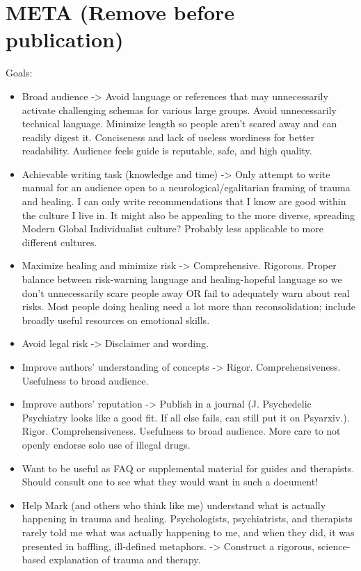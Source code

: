 \documentclass[12pt,letterpaper]{book}
\begin{document}
\section*{META (Remove before publication)}
Goals:
\begin{itemize}
    \item Broad audience -> Avoid language or references that may unnecessarily activate challenging schemas for various large groups. Avoid unnecessarily technical language. Minimize length so people aren't scared away and can readily digest it. Conciseness and lack of useless wordiness for better readability. Audience feels guide is reputable, safe, and high quality.
    \item Achievable writing task (knowledge and time) -> Only attempt to write manual for an audience open to a neurological/egalitarian framing of trauma and healing. I can only write recommendations that I know are good within the culture I live in. It might also be appealing to the more diverse, spreading Modern Global Individualist culture? Probably less applicable to more different cultures.
    \item Maximize healing and minimize risk -> Comprehensive. Rigorous. Proper balance between risk-warning language and healing-hopeful language so we don't unnecessarily scare people away OR fail to adequately warn about real risks. Most people doing healing need a lot more than reconsolidation; include broadly useful resources on emotional skills.
    \item Avoid legal risk -> Disclaimer and wording.
    \item Improve authors' understanding of concepts -> Rigor. Comprehensiveness. Usefulness to broad audience.
    \item Improve authors' reputation -> Publish in a journal (J. Psychedelic Psychiatry looks like a good fit. If all else fails, can still put it on Psyarxiv.). Rigor. Comprehensiveness. Usefulness to broad audience. More care to not openly endorse solo use of illegal drugs.
    \item Want to be useful as FAQ or supplemental material for guides and therapists. Should consult one to see what they would want in such a document!
    \item Help Mark (and others who think like me) understand what is actually happening in trauma and healing. Psychologists, psychiatrists, and therapists rarely told me what was actually happening to me, and when they did, it was presented in baffling, ill-defined metaphors. -> Construct a rigorous, science-based explanation of trauma and therapy.
\end{itemize}
\end{document}
